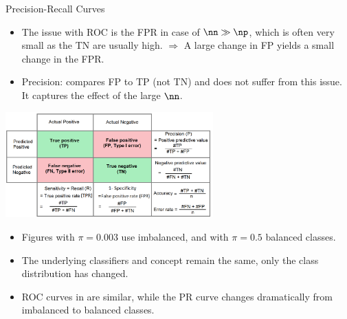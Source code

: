 \begin{vbframe}{Precision-Recall Curves}
\begin{itemize}
  \item The issue with ROC is the FPR in case of $\nn \gg \np$, which is often very small as the TN are usually high. \newline
  $\Rightarrow$ A large change in FP yields a small change in the FPR.
  \item Precision: compares FP to TP (not TN) and does not suffer from this issue.
  It captures the effect of the large $\nn$.
\end{itemize}
\hspace*{\fill}\includegraphics[width=0.6\textwidth]{figure_man/roc-confusion_matrix.png}\hspace*{\fill}

\framebreak

\begin{footnotesize}
\vspace{-0.2cm}
\begin{itemize}
  \item Figures with $\pi = 0.003$ use imbalanced, and with $\pi = 0.5$ balanced classes.
  \item The underlying classifiers and concept remain the same, only the class distribution has changed.
  \item ROC curves in are similar, while the PR curve changes dramatically from imbalanced to balanced classes. 
\end{itemize}
\end{footnotesize}
\vspace{-0.4cm}


\end{vbframe}
